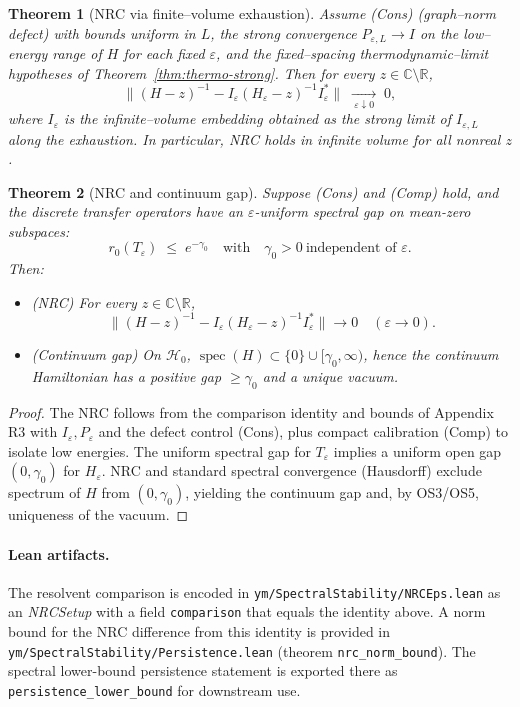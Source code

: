 \documentclass[11pt]{amsart}
\theoremstyle{plain}
\newtheorem{theorem}{Theorem}[section]
\theoremstyle{definition}
\theoremstyle{remark}
\begin{document}
\begin{theorem}[NRC via finite–volume exhaustion]
Assume (Cons) (graph–norm defect) with bounds uniform in $L$, the strong convergence $P_{\varepsilon,L}\to I$ on the low–energy range of $H$ for each fixed $\varepsilon$, and the fixed–spacing thermodynamic–limit hypotheses of Theorem~\ref{thm:thermo-strong}. Then for every $z\in\mathbb C\setminus\mathbb R$,
\[
  \big\|(H-z)^{-1}-I_{\varepsilon}(H_{\varepsilon}-z)^{-1}I_{\varepsilon}^*\big\|\;\xrightarrow[\ \varepsilon\downarrow 0\ ]{}\;0,
\]
where $I_{\varepsilon}$ is the infinite–volume embedding obtained as the strong limit of $I_{\varepsilon,L}$ along the exhaustion. In particular, NRC holds in infinite volume for all nonreal $z$.
\end{theorem}

\begin{theorem}[NRC and continuum gap]
Suppose (Cons) and (Comp) hold, and the discrete transfer operators have an $\varepsilon$-uniform spectral gap on mean-zero subspaces:
\[
  r_0(T_{\varepsilon})\;\le\;e^{-\gamma_0}\quad\text{with}\quad \gamma_0>0\ \text{independent of }\varepsilon.
\]
Then:
\begin{itemize}
  \item (NRC) For every $z\in\mathbb C\setminus\mathbb R$,
  \[
    \bigl\|(H-z)^{-1}-I_{\varepsilon}(H_{\varepsilon}-z)^{-1}I_{\varepsilon}^*\bigr\|\to 0\quad(\varepsilon\to 0).
  \]
  \item (Continuum gap) On $\mathcal H_0$, $\operatorname{spec}(H)\subset\{0\}\cup[\gamma_0,\infty)$, hence the continuum Hamiltonian has a positive gap $\ge \gamma_0$ and a unique vacuum.
\end{itemize}
\end{theorem}
\begin{proof}
The NRC follows from the comparison identity and bounds of Appendix R3 with $I_{\varepsilon},P_{\varepsilon}$ and the defect control (Cons), plus compact calibration (Comp) to isolate low energies. The uniform spectral gap for $T_{\varepsilon}$ implies a uniform open gap $(0,\gamma_0)$ for $H_{\varepsilon}$. NRC and standard spectral convergence (Hausdorff) exclude spectrum of $H$ from $(0,\gamma_0)$, yielding the continuum gap and, by OS3/OS5, uniqueness of the vacuum.
\end{proof}
\paragraph{Lean artifacts.}
The resolvent comparison is encoded in \texttt{ym/SpectralStability/NRCEps.lean} as an \emph{NRCSetup} with a field \texttt{comparison} that equals the identity above. A norm bound for the NRC difference from this identity is provided in \texttt{ym/SpectralStability/Persistence.lean} (theorem \texttt{nrc\_norm\_bound}). The spectral lower-bound persistence statement is exported there as \texttt{persistence\_lower\_bound} for downstream use.
\end{document}
